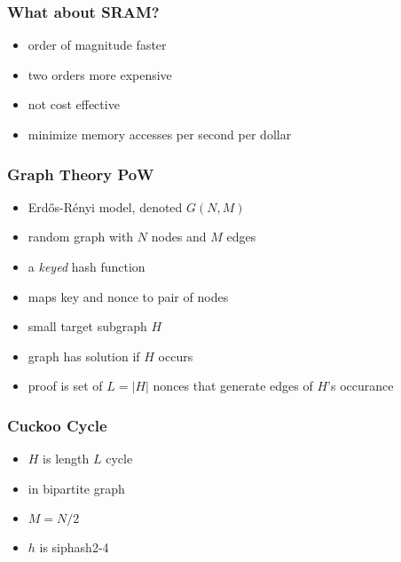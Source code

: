 \documentclass{beamer}
\begin{document}
\begin{frame}
\frametitle{What about SRAM?}
\begin{itemize}
\item order of magnitude faster
\pause
\item two orders more expensive
\pause
\item not cost effective
\pause
\item minimize memory accesses per second per dollar
\end{itemize}
\end{frame}

\begin{frame}
\frametitle{Graph Theory PoW}
\begin{itemize}
\item Erd\H{o}s-R\'{e}nyi model, denoted $G(N,M)$
\pause
\item random graph with $N$ nodes and $M$ edges
\pause
\item a {\em keyed} hash function
\pause
\item maps key and nonce to pair of nodes
\pause
\item small target subgraph $H$
\pause
\item graph has \alert{solution} if $H$ occurs
\pause
\item \alert{proof} is set of $L=|H|$ nonces that generate edges of $H$'s occurance
\end{itemize}
\end{frame}




\begin{frame}
\frametitle{Cuckoo Cycle}
\begin{itemize}
\item $H$ is length $L$ cycle
\pause
\item in bipartite graph
\pause
\item $M=N/2$
\pause
\item $h$ is siphash2-4
\end{itemize}
\end{frame}
\end{document}
